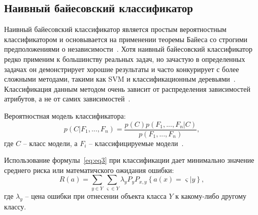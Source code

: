 \subsection{Наивный байесовский классификатор}
Наивный байесовский классификатор является простым вероятностным классификатором и основывается на применении теоремы Байеса со строгими предположениями о независимости~\cite{potapov}. Хотя наивный байесовский классификатор редко применим к большинству реальных задач, но зачастую в определенных задачах он демонстрирует хорошие результаты и часто конкурирует с более сложными методами, такими как SVM и классификационным деревьями~\cite{Mirmozaffari}. Классификация данным методом очень зависит от распределения зависимостей атрибутов, а не от самих зависимостей~\cite{juravlev}.
\par
Вероятностная модель классификатора:
\begin{equation}\label{eq:eq3}
p(C|F_{1},...,F_{n}) = \frac{p(C)p(F_{1},...,F_{n}|C)}{p(F_{1},...,F_{n})},
\end{equation}
где $C$ -- класс модели, а $F_{i}$ -- классифицируемые модели~\cite{Mirmozaffari}.
\par
Использование формулы~\eqref{eq:eq3} при классификации дает минимально значение среднего риска или математичского ожидания ошибки:
\begin{equation}\label{eq:eq4}
R(a) = \sum_{y\in Y}\sum_{\varsigma\in Y}\lambda_{y}P_{y}P_{x,y}\left\lbrace a(x)=\varsigma|y \right\rbrace ,
\end{equation}
где $\lambda_{y}$ -- цена ошибки при отнесении объекта класса $Y$ к какому-либо другому классу.
